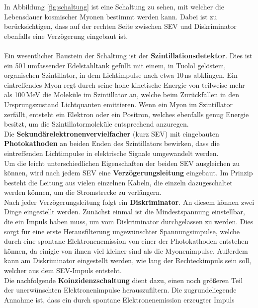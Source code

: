     In Abbildung \ref{fig:schaltung} ist eine Schaltung zu sehen,
    mit welcher die Lebensdauer kosmischer Myonen bestimmt werden kann.
    Dabei ist zu berücksichtigen, dass auf der rechten Seite
    zwischen SEV und Diskriminator ebenfalls eine Verzögerung eingebaut ist.\\
    \ \\
    Ein wesentlicher Baustein der Schaltung ist der \textbf{Szintillationsdetektor}.
    Dies ist ein 50\,l umfassender Edelstahltank gefüllt mit einem, in Tuolol
    gelöstem, organischen Szintillator,
    in dem Lichtimpulse nach etwa 10\,ns abklingen.
    Ein eintreffendes Myon regt durch seine hohe kinetische Energie von
    teilweise mehr als 100\,MeV die Moleküle im Szintillator an, welche
    beim Zurückfallen in den Ursprungszustand Lichtquanten emittieren.
    Wenn ein Myon im Szintillator zerfällt, entsteht ein Elektron oder ein
    Positron, welches ebenfalls genug Energie besitzt, um die Szintillatormoleküle
    entsprechend anzuregen. \\
    Die \textbf{Sekundärelektronenvervielfacher} (kurz SEV) mit eingebauten
    \textbf{Photokathoden} an beiden Enden des Szintillators bewirken,
    dass die eintreffenden Lichtimpulse in elektrische Signale umgewandelt
    werden.\\
    Um die leicht unterschiedlichen Eigenschaften der beiden SEV ausgleichen
    zu können, wird nach jedem SEV eine \textbf{Verzögerungsleitung} eingebaut.
    Im Prinzip besteht die Leitung aus vielen einzelnen Kabeln, die einzeln dazugeschaltet
    werden können, um die Stromstrecke zu verlängern. \\
    Nach jeder Verzögerungsleitung folgt ein \textbf{Diskriminator}. An diesem können zwei
    Dinge eingestellt werden. Zunächst einmal ist die Mindestspannung
    einstellbar, die ein Impuls haben muss, um vom Diskriminator
    durchgelassen zu werden. Dies sorgt für eine erste Herausfilterung
    ungewünschter Spannungsimpulse, welche durch eine spontane Elektronenemission
    von einer der Photokathoden entstehen können, da einigie von ihnen viel kleiner
    sind als die Myonenimpulse. Außerdem kann am Diskriminator
    eingestellt werden, wie lang der Rechteckimpuls sein
    soll, welcher aus dem SEV-Impuls entsteht.\\
    Die nachfolgende \textbf{Koinzidenzschaltung} dient dazu, einen noch größeren Teil
    der unerwünschten Elektronenimpulse herauszufiltern. Die zugrundeliegende
    Annahme ist, dass ein durch spontane Elektronenemission erzeugter Impuls
